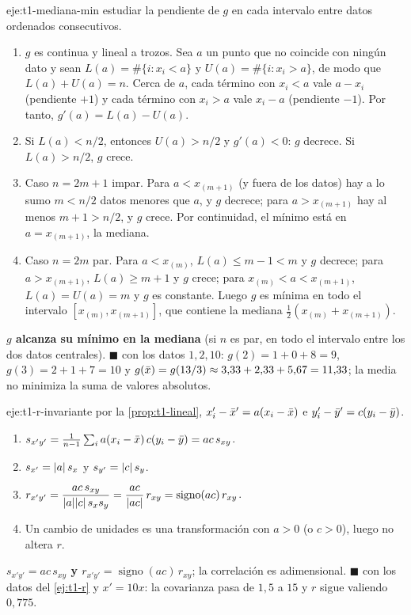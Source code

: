 \begin{solucion}{eje:t1-mediana-min}
\planteamiento estudiar la pendiente de $g$ en cada intervalo entre datos ordenados consecutivos.
\pasos
\begin{enumerate}[label=\arabic*.]
  \item $g$ es continua y lineal a trozos. Sea $a$ un punto que no coincide con ningún dato y sean $L(a)=\#\{i:x_i<a\}$ y $U(a)=\#\{i:x_i>a\}$, de modo que $L(a)+U(a)=n$. Cerca de $a$, cada término con $x_i<a$ vale $a-x_i$ (pendiente $+1$) y cada término con $x_i>a$ vale $x_i-a$ (pendiente $-1$). Por tanto, $g'(a)=L(a)-U(a)$.
  \item Si $L(a)<n/2$, entonces $U(a)>n/2$ y $g'(a)<0$: $g$ decrece. Si $L(a)>n/2$, $g$ crece.
  \item Caso $n=2m+1$ impar. Para $a<x_{(m+1)}$ (y fuera de los datos) hay a lo sumo $m<n/2$ datos menores que $a$, y $g$ decrece; para $a>x_{(m+1)}$ hay al menos $m+1>n/2$, y $g$ crece. Por continuidad, el mínimo está en $a=x_{(m+1)}$, la mediana.
  \item Caso $n=2m$ par. Para $a<x_{(m)}$, $L(a)\le m-1<m$ y $g$ decrece; para $a>x_{(m+1)}$, $L(a)\ge m+1$ y $g$ crece; para $x_{(m)}<a<x_{(m+1)}$, $L(a)=U(a)=m$ y $g$ es constante. Luego $g$ es mínima en todo el intervalo $[x_{(m)},x_{(m+1)}]$, que contiene la mediana $\tfrac12(x_{(m)}+x_{(m+1)})$.
\end{enumerate}
\resultado \textbf{$g$ alcanza su mínimo en la mediana} (si $n$ es par, en todo el intervalo entre los dos datos centrales). $\blacksquare$
\comprobacion con los datos $1,2,10$: $g(2)=1+0+8=9$, $g(3)=2+1+7=10$ y $g(\bar{x})=g(13/3)\approx3{,}33+2{,}33+5{,}67=11{,}33$; la media no minimiza la suma de valores absolutos.
\end{solucion}

\begin{solucion}{eje:t1-r-invariante}
\planteamiento por la \cref{prop:t1-lineal}, $x_i'-\bar{x}'=a(x_i-\bar{x})$ e $y_i'-\bar{y}'=c(y_i-\bar{y})$.
\pasos
\begin{enumerate}[label=\arabic*.]
  \item $s_{x'y'}=\frac{1}{n-1}\sum_i a(x_i-\bar{x})\,c(y_i-\bar{y})=ac\,s_{xy}$.
  \item $s_{x'}=\lvert a\rvert\,s_x$ y $s_{y'}=\lvert c\rvert\,s_y$.
  \item $r_{x'y'}=\dfrac{ac\,s_{xy}}{\lvert a\rvert\lvert c\rvert\,s_xs_y}=\dfrac{ac}{\lvert ac\rvert}\,r_{xy}=\operatorname{signo}(ac)\,r_{xy}$.
  \item Un cambio de unidades es una transformación con $a>0$ (o $c>0$), luego no altera $r$.
\end{enumerate}
\resultado \textbf{$s_{x'y'}=ac\,s_{xy}$ y $r_{x'y'}=\operatorname{signo}(ac)\,r_{xy}$}; la correlación es adimensional. $\blacksquare$
\comprobacion con los datos del \cref{ej:t1-r} y $x'=10x$: la covarianza pasa de $1{,}5$ a $15$ y $r$ sigue valiendo $0{,}775$.
\end{solucion}

